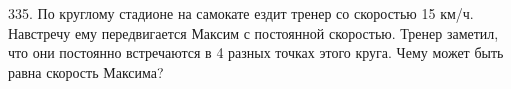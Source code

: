 335. По круглому стадионе на самокате ездит тренер со скоростью 15 км/ч. Навстречу ему передвигается Максим с постоянной скоростью. Тренер заметил, что они постоянно встречаются в 4 разных точках этого круга. Чему может быть равна скорость Максима?\\
